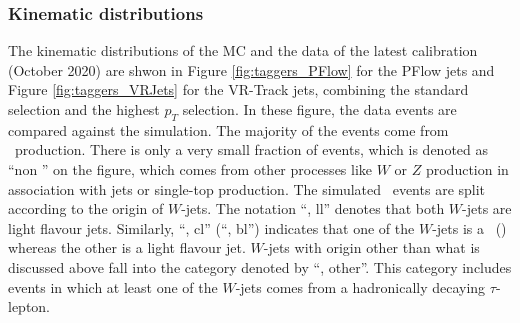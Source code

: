 \documentclass[letterpaper,12pt]{article}
\begin{document}
\subsubsection{Kinematic distributions}
The kinematic distributions of the MC and the data of the latest calibration 
(October 2020) are shwon in Figure \ref{fig:taggers_PFlow} for the PFlow jets and 
Figure \ref{fig:taggers_VRJets} for the VR-Track jets, 
combining the standard selection and the highest $p_T$ selection. 
In these figure, the data events are compared against the simulation.
The majority of the events come from \ttbar\ production. There is only
a very small fraction of events, which is denoted as ``non \ttbar''
on the figure, which comes from other processes like $W$ or $Z$ production
in association with jets or single-top production. The simulated \ttbar\
events are split according to the origin of $W$-jets. The notation
``\ttbar, ll'' denotes that both $W$-jets are light flavour jets.
Similarly, ``\ttbar, cl'' (``\ttbar, bl'') 
indicates that one of the $W$-jets is a \cjet\ (\bjet)
whereas the other is a light flavour jet. $W$-jets with origin
other than what is discussed above fall into the 
category denoted by ``\ttbar, other''. This category includes
events in which at least one of the $W$-jets comes from a
hadronically decaying $\tau$-lepton. 
\end{document}

